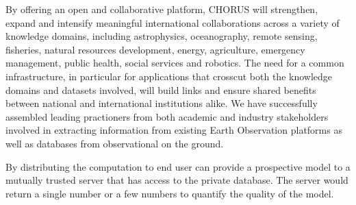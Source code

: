 By offering an open and collaborative platform, CHORUS will
strengthen, expand and intensify meaningful international
collaborations across a variety of knowledge domains, including
astrophysics, oceanography, remote sensing, fisheries, natural
resources development, energy, agriculture, emergency management,
public health, social services and robotics.  The need for a common
infrastructure, in particular for applications that crosscut both the
knowledge domains and datasets involved, will build links and ensure
shared benefits between national and international institutions alike.
We have successfully assembled leading practioners from both academic
and industry stakeholders involved in extracting information from
existing Earth Observation platforms as well as databases from
observational on the ground.

By distributing the computation to end user can provide a prospective
model to a mutually trusted server that has access to the private
database.  The server would return a single number or a few numbers to
quantify the quality of the model.
          

